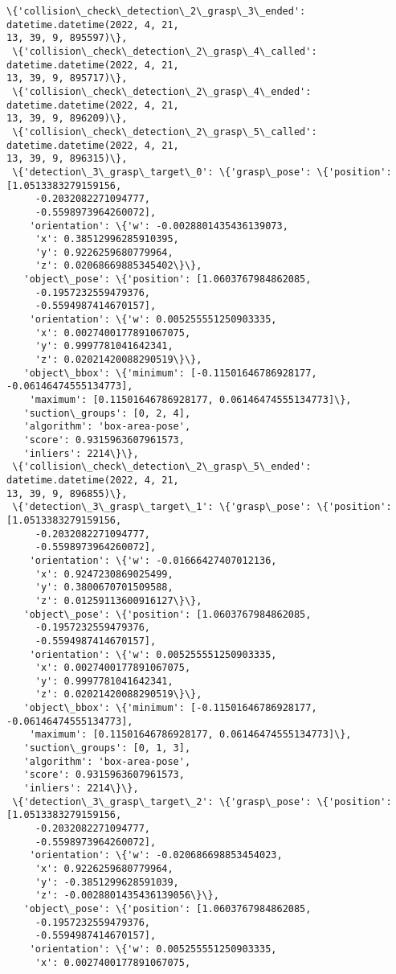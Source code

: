 \documentclass[11pt]{article}
\begin{document}
\begin{tcolorbox}[breakable, size=fbox, boxrule=.5pt, pad at break*=1mm, opacityfill=0]
\begin{Verbatim}[commandchars=\\\{\}]
 \{'collision\_check\_detection\_2\_grasp\_3\_ended': datetime.datetime(2022, 4, 21,
13, 39, 9, 895597)\},
 \{'collision\_check\_detection\_2\_grasp\_4\_called': datetime.datetime(2022, 4, 21,
13, 39, 9, 895717)\},
 \{'collision\_check\_detection\_2\_grasp\_4\_ended': datetime.datetime(2022, 4, 21,
13, 39, 9, 896209)\},
 \{'collision\_check\_detection\_2\_grasp\_5\_called': datetime.datetime(2022, 4, 21,
13, 39, 9, 896315)\},
 \{'detection\_3\_grasp\_target\_0': \{'grasp\_pose': \{'position': [1.0513383279159156,
     -0.2032082271094777,
     -0.5598973964260072],
    'orientation': \{'w': -0.0028801435436139073,
     'x': 0.38512996285910395,
     'y': 0.9226259680779964,
     'z': 0.02068669885345402\}\},
   'object\_pose': \{'position': [1.0603767984862085,
     -0.1957232559479376,
     -0.5594987414670157],
    'orientation': \{'w': 0.005255551250903335,
     'x': 0.0027400177891067075,
     'y': 0.9997781041642341,
     'z': 0.02021420088290519\}\},
   'object\_bbox': \{'minimum': [-0.11501646786928177, -0.06146474555134773],
    'maximum': [0.11501646786928177, 0.06146474555134773]\},
   'suction\_groups': [0, 2, 4],
   'algorithm': 'box-area-pose',
   'score': 0.9315963607961573,
   'inliers': 2214\}\},
 \{'collision\_check\_detection\_2\_grasp\_5\_ended': datetime.datetime(2022, 4, 21,
13, 39, 9, 896855)\},
 \{'detection\_3\_grasp\_target\_1': \{'grasp\_pose': \{'position': [1.0513383279159156,
     -0.2032082271094777,
     -0.5598973964260072],
    'orientation': \{'w': -0.01666427407012136,
     'x': 0.9247230869025499,
     'y': 0.3800670701509588,
     'z': 0.01259113600916127\}\},
   'object\_pose': \{'position': [1.0603767984862085,
     -0.1957232559479376,
     -0.5594987414670157],
    'orientation': \{'w': 0.005255551250903335,
     'x': 0.0027400177891067075,
     'y': 0.9997781041642341,
     'z': 0.02021420088290519\}\},
   'object\_bbox': \{'minimum': [-0.11501646786928177, -0.06146474555134773],
    'maximum': [0.11501646786928177, 0.06146474555134773]\},
   'suction\_groups': [0, 1, 3],
   'algorithm': 'box-area-pose',
   'score': 0.9315963607961573,
   'inliers': 2214\}\},
 \{'detection\_3\_grasp\_target\_2': \{'grasp\_pose': \{'position': [1.0513383279159156,
     -0.2032082271094777,
     -0.5598973964260072],
    'orientation': \{'w': -0.020686698853454023,
     'x': 0.9226259680779964,
     'y': -0.3851299628591039,
     'z': -0.0028801435436139056\}\},
   'object\_pose': \{'position': [1.0603767984862085,
     -0.1957232559479376,
     -0.5594987414670157],
    'orientation': \{'w': 0.005255551250903335,
     'x': 0.0027400177891067075,

\end{Verbatim}
\end{tcolorbox}
\end{document}
